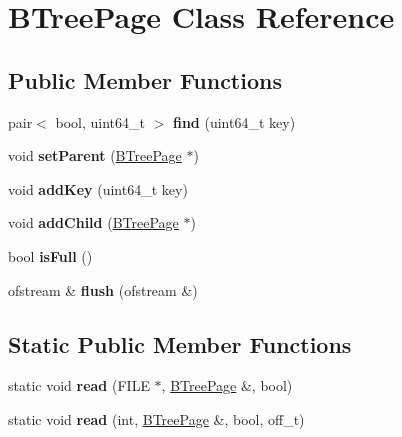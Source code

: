 \hypertarget{class_b_tree_page}{}\section{B\+Tree\+Page Class Reference}
\label{class_b_tree_page}
\subsection*{Public Member Functions}
\begin{DoxyCompactItemize}
\item 
\hypertarget{class_b_tree_page_ab1a09989306d53d00fad36ec856f1d6a}{}pair$<$ bool, uint64\+\_\+t $>$ {\bfseries find} (uint64\+\_\+t key)\label{class_b_tree_page_ab1a09989306d53d00fad36ec856f1d6a}

\item 
\hypertarget{class_b_tree_page_a072d6f5aff5dbc4835843a1ce834d6a0}{}void {\bfseries set\+Parent} (\hyperlink{class_b_tree_page}{B\+Tree\+Page} $\ast$)\label{class_b_tree_page_a072d6f5aff5dbc4835843a1ce834d6a0}

\item 
\hypertarget{class_b_tree_page_a6f0a55351b3575f1504a38c8e4ad5891}{}void {\bfseries add\+Key} (uint64\+\_\+t key)\label{class_b_tree_page_a6f0a55351b3575f1504a38c8e4ad5891}

\item 
\hypertarget{class_b_tree_page_a603a37a0dbbb8996d21063ecbe03a1c3}{}void {\bfseries add\+Child} (\hyperlink{class_b_tree_page}{B\+Tree\+Page} $\ast$)\label{class_b_tree_page_a603a37a0dbbb8996d21063ecbe03a1c3}

\item 
\hypertarget{class_b_tree_page_a102c6fd32f4c2254c07b1e214530e23e}{}bool {\bfseries is\+Full} ()\label{class_b_tree_page_a102c6fd32f4c2254c07b1e214530e23e}

\item 
\hypertarget{class_b_tree_page_afaceefe62feb4d475328616b4c2b8142}{}ofstream \& {\bfseries flush} (ofstream \&)\label{class_b_tree_page_afaceefe62feb4d475328616b4c2b8142}

\end{DoxyCompactItemize}
\subsection*{Static Public Member Functions}
\begin{DoxyCompactItemize}
\item 
\hypertarget{class_b_tree_page_a6d96d17702420c219cb89d18f4841117}{}static void {\bfseries read} (F\+I\+L\+E $\ast$, \hyperlink{class_b_tree_page}{B\+Tree\+Page} \&, bool)\label{class_b_tree_page_a6d96d17702420c219cb89d18f4841117}

\item 
\hypertarget{class_b_tree_page_a6505accec8fefbec85a2b7bcba8b53ef}{}static void {\bfseries read} (int, \hyperlink{class_b_tree_page}{B\+Tree\+Page} \&, bool, off\+\_\+t)\label{class_b_tree_page_a6505accec8fefbec85a2b7bcba8b53ef}

\end{DoxyCompactItemize}
